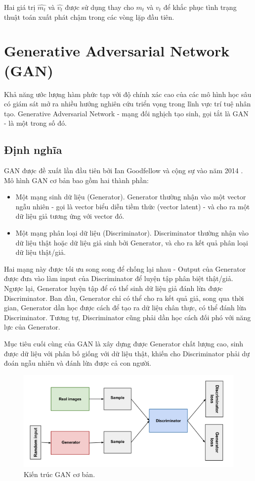 \documentclass[12pt]{extreport}
\begin{document}
Hai giá trị $ \hat{m_t} $ và $ \hat{v_t} $ được sử dụng thay cho  $ m_t $ và  $ v_t $ để khắc phục tình trạng thuật toán xuất phát chậm trong các vòng lặp đầu tiên.

\section{Generative Adversarial Network (GAN)}

Khả năng ước lượng hàm phức tạp với độ chính xác cao của các mô hình học sâu có giám sát mở ra nhiều hướng nghiên cứu triển vọng trong lĩnh vực trí tuệ nhân tạo. Generative Adversarial Network - mạng đối nghịch tạo sinh, gọi tắt là GAN - là một trong số đó.

\subsection{Định nghĩa}

GAN được đề xuất lần đầu tiên bởi Ian Goodfellow và cộng sự vào năm 2014 \cite{NIPS2014_5ca3e9b1}. Mô hình GAN cơ bản bao gồm hai thành phần:

\begin{itemize}
    \item Một mạng sinh dữ liệu (Generator). Generator thường nhận vào một vector ngẫu nhiên - gọi là vector biểu diễn tiềm thức (vector latent) - và cho ra một dữ liệu giả tương ứng với vector đó.
    \item Một mạng phân loại dữ liệu (Discriminator). Discriminator thường nhận vào dữ liệu thật hoặc dữ liệu giả sinh bởi Generator, và cho ra kết quả phân loại dữ liệu thật/giả.
\end{itemize}

Hai mạng này được tối ưu song song để chống lại nhau - Output của Generator được đưa vào làm input của Discriminator để luyện tập phân biệt thật/giả. Ngược lại, Generator luyện tập để có thể sinh dữ liệu giả đánh lừa được Discriminator. Ban đầu, Generator chỉ có thể cho ra kết quả giả, song qua thời gian, Generator dần học được cách để tạo ra dữ liệu chân thực, có thể đánh lừa Discriminator. Tương tự, Discriminator cũng phải dần học cách đối phó với năng lực của Generator.

Mục tiêu cuối cùng của GAN là xây dựng được Generator chất lượng cao, sinh được dữ liệu với phân bố giống với dữ liệu thật, khiến cho Discriminator phải dự đoán ngẫu nhiên và đánh lừa được cả con người.

\begin{figure}[H]
    \centering
    \includegraphics[width=\textwidth]{figure13.png}
    \caption{Kiến trúc GAN cơ bản.}
\end{figure}
\end{document}
